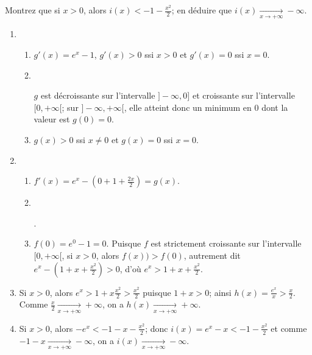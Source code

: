 \documentclass[a4paper,12pt]{exam}
\begin{document}
\begin{questions}
\begin{enumerate}
 Montrez que si $x>0$, alors $i(x)<-1-\tfrac{x^2}2$; en déduire que $i(x)\xrightarrow[x\rightarrow+\infty]{}-\infty$.
 \end{enumerate}
 \begin{solution}
  \begin{enumerate}
 \item\ 
 \begin{enumerate}
 \item $g'(x)=e^x-1$, $g'(x)>0$ ssi $x>0$ et $g'(x)=0$ ssi $x=0$.
 \item\
 \begin{center}
\end{center}
$g$ est décroissante sur l'intervalle $]-\infty,0]$ et croissante sur l'intervalle $[0,+\infty[$; sur $]-\infty,+\infty[$, elle atteint donc un minimum en $0$ dont la valeur est $g(0)=0$.
 \item $g(x)>0$ ssi $x\neq 0$ et $g(x)=0$ ssi $x=0$.
 \end{enumerate}
 \item\ 
 \begin{enumerate}
  \item $f'(x)=e^x-(0+1+\tfrac{2x}2)=g(x)$.
  \item\ \begin{center}\end{center}.
  \item $f(0)=e^0-1=0$. Puisque $f$ est strictement croissante sur l'intervalle $[0,+\infty[$, si $x>0$, alors $f(x))>f(0)$, autrement dit $e^x-(1+x+\tfrac{x^2}2)>0$, d'où $e^x>1+x+\tfrac{x^2}2$.
 \end{enumerate}
 \item Si $x>0$, alors $e^x>1+x\tfrac{x^2}{2}>\tfrac{x^2}2$ puisque $1+x>0$; ainsi $h(x)=\tfrac{e^x}x>\tfrac x2$. Comme $\tfrac x2\xrightarrow[x\rightarrow+\infty]{}+\infty$, on a $h(x)\xrightarrow[x\rightarrow+\infty]{}+\infty$.
 \item Si $x>0$, alors $-e^x<-1-x-\tfrac{x^2}2$; donc $i(x)=e^x-x<-1-\tfrac{x^2}2$ et comme $-1-x\xrightarrow[x\rightarrow+\infty]{}-\infty$, on a $i(x)\xrightarrow[x\rightarrow+\infty]{}-\infty$.
 \end{enumerate}
 \end{solution}


\end{questions}
\end{document}
